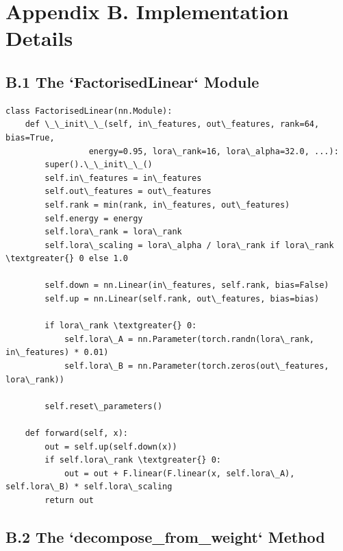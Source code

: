 
\section{Appendix B. Implementation Details}

\subsection{B.1 The `FactorisedLinear` Module}

\begin{lstlisting}
class FactorisedLinear(nn.Module):
    def \_\_init\_\_(self, in\_features, out\_features, rank=64, bias=True,
                 energy=0.95, lora\_rank=16, lora\_alpha=32.0, ...):
        super().\_\_init\_\_()
        self.in\_features = in\_features
        self.out\_features = out\_features
        self.rank = min(rank, in\_features, out\_features)
        self.energy = energy
        self.lora\_rank = lora\_rank
        self.lora\_scaling = lora\_alpha / lora\_rank if lora\_rank \textgreater{} 0 else 1.0
        
        self.down = nn.Linear(in\_features, self.rank, bias=False)
        self.up = nn.Linear(self.rank, out\_features, bias=bias)
        
        if lora\_rank \textgreater{} 0:
            self.lora\_A = nn.Parameter(torch.randn(lora\_rank, in\_features) * 0.01)
            self.lora\_B = nn.Parameter(torch.zeros(out\_features, lora\_rank))
        
        self.reset\_parameters()
    
    def forward(self, x):
        out = self.up(self.down(x))
        if self.lora\_rank \textgreater{} 0:
            out = out + F.linear(F.linear(x, self.lora\_A), self.lora\_B) * self.lora\_scaling
        return out
\end{lstlisting}

\subsection{B.2 The `decompose\_from\_weight` Method}

